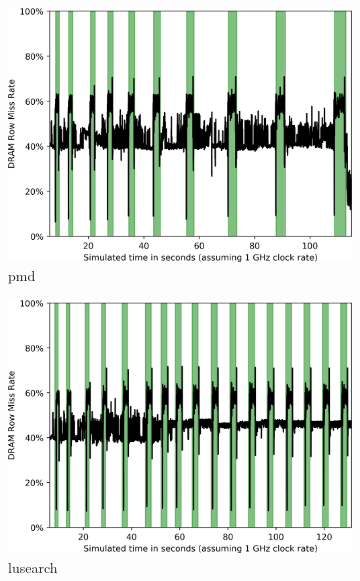 \begin{figure}
	\centering
	\begin{subfigure}[t]{0.23\textwidth}
		\includegraphics[width=\textwidth]{results/rowmisses_pmd.png}
		\caption{pmd}
	\end{subfigure}
	\begin{subfigure}[t]{0.23\textwidth}
		\includegraphics[width=\textwidth]{results/rowmisses_lusearch.png}
		\caption{lusearch}
	\end{subfigure}
	\begin{subfigure}[t]{0.23\textwidth}

\end{subfigure}
\end{figure}
